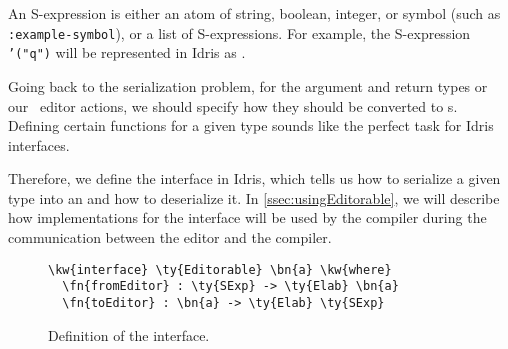 An S-expression is either an atom of string, boolean, integer, or symbol (such
as \texttt{:example-symbol}), or a list of S-expressions.
For example, the S-expression \texttt{'("q")} will be represented in Idris as
\mbox{}.

Going back to the serialization problem, for the argument and return types or
our \Elab\ editor actions, we should specify how they should be converted to
s.  Defining certain functions for a given type sounds like the
perfect task for Idris interfaces.

Therefore, we define the interface  in Idris, which tells us
how to serialize a given type into an  and how to deserialize it.
In \autoref{ssec:usingEditorable}, we will describe how implementations for
the  interface will be used by the compiler during the
communication between the editor and the compiler.

\begin{figure}[H]
\caption{Definition of the  interface.}
\label{code:editorable}
\begin{Verbatim}
\kw{interface} \ty{Editorable} \bn{a} \kw{where}
  \fn{fromEditor} : \ty{SExp} -> \ty{Elab} \bn{a}
  \fn{toEditor} : \bn{a} -> \ty{Elab} \ty{SExp}
\end{Verbatim}
\end{figure}


